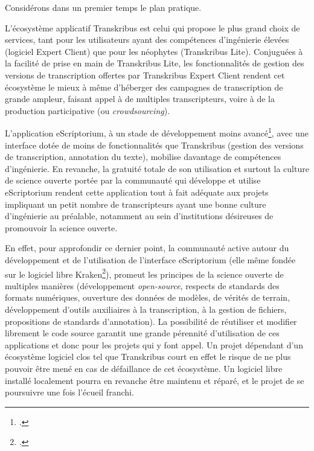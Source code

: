 \documentclass[a4paper,12pt,twoside]{book}
\begin{document}
			Considérons dans un premier temps le plan pratique.
			
			L'écosystème applicatif Transkribus est celui qui propose le plus grand choix de services, tant pour les utilisateurs ayant des compétences d'ingénierie élevées (logiciel Expert Client) que pour les néophytes (Transkribus Lite). Conjuguées à la facilité de prise en main de Transkribus Lite, les fonctionnalités de gestion des versions de transcription offertes par Transkribus Expert Client rendent cet écosystème le mieux à même d'héberger des campagnes de transcription de grande ampleur, faisant appel à de multiples transcripteurs, voire à de la production participative (ou \textit{crowdsourcing}).
			
			L'application eScriptorium, à un stade de développement moins avancé\footcite{stokesEScriptoriumVREManuscript2021}, avec une interface dotée de moins de fonctionnalités que Transkribus (gestion des versions de transcription, annotation du texte), mobilise davantage de compétences d'ingénierie. En revanche, la gratuité totale de son utilisation et surtout la culture de science ouverte portée par la communauté qui développe et utilise eScriptorium rendent cette application tout à fait adéquate aux projets impliquant un petit nombre de transcripteurs ayant une bonne culture d'ingénierie au préalable, notamment au sein d'institutions désireuses de promouvoir la science ouverte.
			
			En effet, pour approfondir ce dernier point, la communauté active autour du développement et de l'utilisation de l'interface eScriptorium (elle même fondée sur le logiciel libre Kraken\footcite{KrakenDocumentation}), promeut les principes de la science ouverte de multiples manières (développement \textit{open-source}, respects de standards des formats numériques, ouverture des données de modèles, de vérités de terrain, développement d'outils auxiliaires à la transcription, à la gestion de fichiers, propositions de standards d'annotation). La possibilité de réutiliser et modifier librement le code source garantit une grande pérennité d'utilisation de ces applications et donc pour les projets qui y font appel. Un projet dépendant d'un écosystème logiciel clos tel que Transkribus court en effet le risque de ne plus pouvoir être mené en cas de défaillance de cet écosystème. Un logiciel libre installé localement pourra en revanche être maintenu et réparé, et le projet de se poursuivre une fois l'écueil franchi.
			
\end{document}
